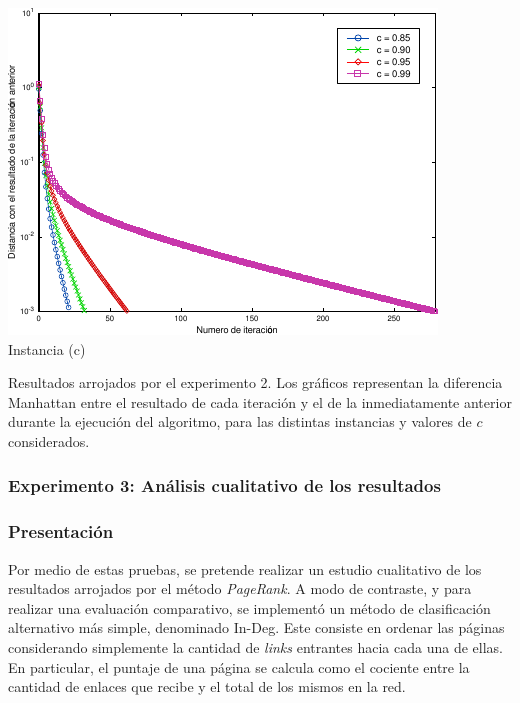             \noindent{} \begin{minipage}{\textwidth}
                \begin{center}
                    \includegraphics{graficos/exp2-c.pdf} \\
                    {\small Instancia (c)}

                    \vspace{1em}

                    Resultados arrojados por el experimento 2. Los gráficos representan la diferencia Manhattan entre el resultado de cada iteración y el de la inmediatamente anterior durante la ejecución del algoritmo, para las distintas instancias y valores de $c$ considerados.

                    \vspace{1em}
                \end{center}
            \end{minipage}



        \subsubsection{Experimento 3: Análisis cualitativo de los resultados}

            \subsubsection*{Presentación}
            Por medio de estas pruebas, se pretende realizar un estudio cualitativo de los resultados arrojados por el método \emph{PageRank}. A modo de contraste, y para realizar una evaluación comparativo, se implementó un método de clasificación alternativo más simple, denominado In-Deg. Este consiste en ordenar las páginas considerando simplemente la cantidad de \emph{links} entrantes hacia cada una de ellas. En particular, el puntaje de una página se calcula como el cociente entre la cantidad de enlaces que recibe y el total de los mismos en la red.

